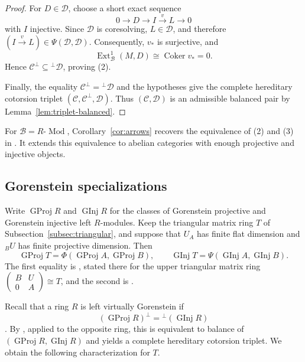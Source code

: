 \documentclass[11pt]{amsart}
\theoremstyle{definition}
\theoremstyle{remark}
\theoremstyle{plain}
\numberwithin{equation}{section}
\begin{document}
\begin{proof}
	For $D\in\mathcal{D}$, choose a short exact sequence
	\[
	0\longrightarrow D\longrightarrow I
	\xrightarrow{v}L\longrightarrow0
	\]
	with $I$ injective. Since $\mathcal{D}$ is coresolving, $L\in\mathcal{D}$, and
	therefore $(I\xrightarrow{v}L)\in
	\Psi(\mathcal{D},\mathcal{D})$. Consequently, $v_*$ is surjective, and
	\[
	\operatorname{Ext}^1_{\mathcal{B}}(M,D)
	\cong\operatorname{Coker}v_*=0.
	\]
	Hence $\mathcal{C}^\perp\subseteq{}^\perp\mathcal{D}$, proving \textup{(2)}.
	
	Finally, the equality
	$\mathcal{C}^\perp={}^\perp\mathcal{D}$
	and the hypotheses give the complete hereditary cotorsion triplet $(\mathcal{C},\mathcal{C}^\perp,\mathcal{D})$.
	Thus $(\mathcal{C},\mathcal{D})$ is an admissible balanced pair by Lemma~\ref{lem:triplet-balanced}.
\end{proof}

For $\mathcal{B}=R\text{-}\operatorname{Mod}$,
Corollary~\ref{cor:arrows} recovers the equivalence of \textup{(2)} and \textup{(3)} in
\cite[Corollary~2.6]{Mao}. It extends this equivalence to abelian categories with enough projective and injective objects.

\subsection{Gorenstein specializations}\label{subsec:gorenstein}

Write $\operatorname{GProj} R$ and $\operatorname{GInj} R$ for the classes of Gorenstein projective
and Gorenstein injective left $R$-modules. Keep the triangular matrix
ring $T$ of Subsection~\ref{subsec:triangular}, and suppose that $U_A$
has finite flat dimension and ${}_BU$ has finite projective dimension.
Then
\[
 \operatorname{GProj} T = \Phi(\operatorname{GProj} A, \operatorname{GProj} B), \qquad
 \operatorname{GInj} T = \Psi(\operatorname{GInj} A, \operatorname{GInj} B).
\]
The first equality is \cite[Theorem~1.1]{LiZhengHuZhu}, stated there for
the upper triangular matrix ring
$\left(\begin{smallmatrix}B & U\\ 0 & A\end{smallmatrix}\right) \cong T$, and the
second is \cite[Propositions~3.3, 5.2 and~5.5]{YuanHeWu}.

Recall that a ring $R$ is left virtually Gorenstein if
\[
 (\operatorname{GProj} R)^\perp = {}^\perp(\operatorname{GInj} R)
\]
\cite[Section~4]{EPZ}. By
\cite[Corollary~3.11]{EHT}, applied to the opposite ring, this is equivalent
to balance of $(\operatorname{GProj} R, \operatorname{GInj} R)$ and yields a complete hereditary
cotorsion triplet. We obtain the following characterization for $T$.
\end{document}
